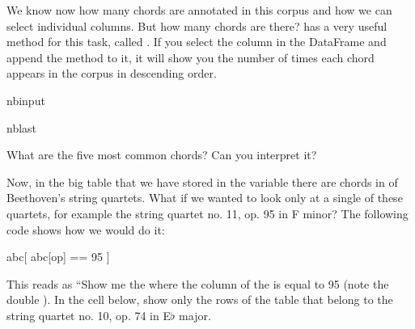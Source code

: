 \documentclass[letterpaper,10pt,english]{sphinxmanual}
\begin{document}
\sphinxAtStartPar
We know now how many chords are annotated in this corpus and how we can select individual columns. But how many  chords are there?  has a very useful method for this task, called . If you select the  column in the DataFrame  and append the  method to it, it will show you the number of times each chord appears in the corpus in descending order.

\begin{sphinxuseclass}{nbinput}
\begin{sphinxuseclass}{nblast}
{
\begin{sphinxVerbatim}[commandchars=\\\{\}]
\llap{\color{nbsphinxin}[ ]:\,\hspace{\fboxrule}\hspace{\fboxsep}}
\end{sphinxVerbatim}
}

\end{sphinxuseclass}
\end{sphinxuseclass}
\sphinxAtStartPar
What are the five most common chords? Can you interpret it?

\sphinxAtStartPar
Now, in the big table that we have stored in the variable  there are  chords in  of Beethoven’s string quartets. What if we wanted to look only at a single of these quartets, for example the string quartet no. 11, op. 95 in F minor? The following code shows how we would do it:

\begin{sphinxVerbatim}[commandchars=\\\{\}]
abc[ abc[\PYGZdq{}op\PYGZdq{}] == 95 ]
\end{sphinxVerbatim}

\sphinxAtStartPar
This reads as “Show me the  where the  column of the  is equal to 95 (note the double \sphinxcode{\sphinxupquote{==}}). In the cell below, show only the rows of the table that belong to the string quartet no. 10, op. 74 in E\(\flat\) major.
\end{document}
